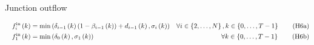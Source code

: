 \documentclass[xcolor=svgnames, english, smaller]{beamer}
\theoremstyle{plain}
\theoremstyle{definition}
\theoremstyle{plain}
\theoremstyle{plain}
\newcommand \Fontvi{\fontsize{8}{8}\selectfont}
\newcommand \systemDiagOffset{-1.8in}
\newcommand \systemDiagResizeMult{1.3}
\begin{document}
\begin{frame}{Junction outflow}

\Fontvi

\begin{figure}[t]
\hspace{\systemDiagOffset}
\resizebox{\systemDiagResizeMult\columnwidth}{!}{}
\label{fig:system}
\end{figure}

\begin{subequations}
\begin{align}
&& f_{i}^{\text{in}}\left(k\right) & =\min\left(\delta_{i-1}\left(k\right)\left(1-\beta_{i-1}\left(k\right)\right)+d_{i-1}\left(k\right),\sigma_{i}\left(k\right)\right) & \forall i\in\left\{ 2,\ldots,N\right\} ,k\in\left\{ 0,\ldots,T-1\right\}
\tag{H6a}
\label{eq:junctionFlowMaximization} \\
&& f_{1}^{\text{in}}\left(k\right) & =\min\left(\delta_{0}\left(k\right),\sigma_{1}\left(k\right)\right) &
\forall k\in\left\{ 0,\ldots,T-1\right\}
\tag{H6b}
\label{eq:junctionFlowConservationSpecial2}	
\end{align}
\label{eq:juncmaxgroup}
\end{subequations}

\end{frame}
\end{document}
